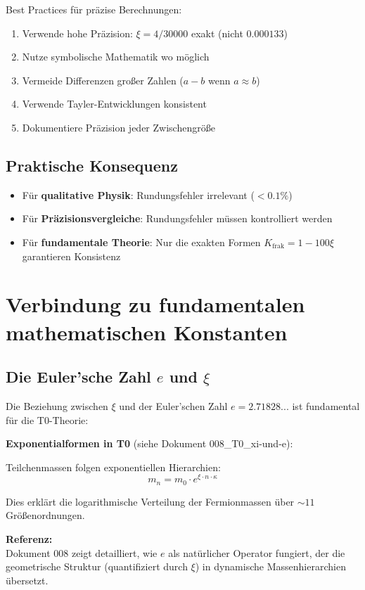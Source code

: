 	Best Practices für präzise Berechnungen:
	\begin{enumerate}
		\item Verwende hohe Präzision: $\xi = 4/30000$ exakt (nicht $0.000133$)
		\item Nutze symbolische Mathematik wo möglich
		\item Vermeide Differenzen großer Zahlen ($a - b$ wenn $a \approx b$)
		\item Verwende Tayler-Entwicklungen konsistent
		\item Dokumentiere Präzision jeder Zwischengröße
	\end{enumerate}
	
	\subsection{Praktische Konsequenz}
	
	\begin{itemize}
		\item Für \textbf{qualitative Physik}: Rundungsfehler irrelevant ($< 0.1\%$)
		\item Für \textbf{Präzisionsvergleiche}: Rundungsfehler müssen kontrolliert werden
		\item Für \textbf{fundamentale Theorie}: Nur die exakten Formen $K_{\text{frak}} = 1 - 100\xi$ garantieren Konsistenz
	\end{itemize}
	
	\section{Verbindung zu fundamentalen mathematischen Konstanten}
	
	\subsection{Die Euler'sche Zahl $e$ und $\xi$}
	
	Die Beziehung zwischen $\xi$ und der Euler'schen Zahl $e = 2.71828...$ ist fundamental für die T0-Theorie:
	
	\begin{beziehung}
		\textbf{Exponentialformen in T0} (siehe Dokument 008\_T0\_xi-und-e):
		
		Teilchenmassen folgen exponentiellen Hierarchien:
		\begin{equation}
			m_n = m_0 \cdot e^{\xi \cdot n \cdot \kappa}
		\end{equation}
		
		Dies erklärt die logarithmische Verteilung der Fermionmassen über $\sim 11$ Größenordnungen.
		
		\textbf{Referenz:} \\

		Dokument 008 zeigt detailliert, wie $e$ als natürlicher Operator fungiert, der die geometrische Struktur (quantifiziert durch $\xi$) in dynamische Massenhierarchien übersetzt.
	\end{beziehung}
	
